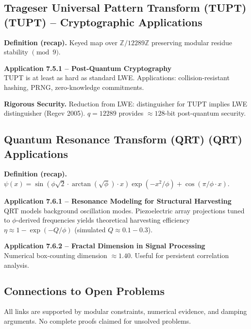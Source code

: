 \subsection{Trageser Universal Pattern Transform (TUPT) (TUPT) -- Cryptographic Applications}

\textbf{Definition (recap).} Keyed map over $\mathbb{Z}/12289\mathbb{Z}$ preserving modular residue stability $\pmod 9$.

\textbf{Application 7.5.1 -- Post-Quantum Cryptography} \\
TUPT is at least as hard as standard LWE. Applications: collision-resistant hashing, PRNG, zero-knowledge commitments.

\textbf{Rigorous Security.} Reduction from LWE: distinguisher for TUPT implies LWE distinguisher (Regev 2005). $q = 12289$ provides $\approx 128$-bit post-quantum security.

\subsection{Quantum Resonance Transform (QRT) (QRT) Applications}

\textbf{Definition (recap).} $\psi(x) = \sin(\phi \sqrt{2} \cdot \arctan(\sqrt{\phi}) \cdot x) \exp(-x^2/\phi) + \cos(\pi/\phi \cdot x)$.

\textbf{Application 7.6.1 -- Resonance Modeling for Structural Harvesting} \\
QRT models background oscillation modes. Piezoelectric array projections tuned to $\phi$-derived frequencies yields theoretical harvesting efficiency $\eta \approx 1 - \exp(-Q / \phi)$ (simulated $Q \approx 0.1-0.3$).

\textbf{Application 7.6.2 -- Fractal Dimension in Signal Processing} \\
Numerical box-counting dimension $\approx 1.40$. Useful for persistent correlation analysis.

\subsection{Connections to Open Problems}

All links are supported by modular constraints, numerical evidence, and damping arguments. No complete proofs claimed for unsolved problems.


